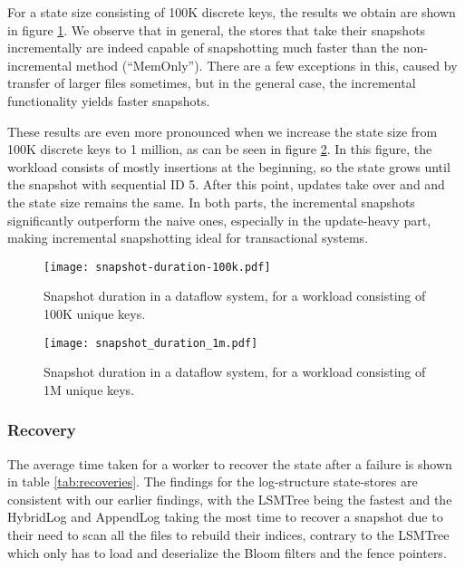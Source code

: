 For a state size consisting of 100K discrete keys, the results we obtain are shown in figure \ref{fig:snapshot-dataflow-100k}. We observe that in general, the stores that take their snapshots incrementally are indeed capable of snapshotting much faster than the non-incremental method (``MemOnly''). There are a few exceptions in this, caused by transfer of  larger files sometimes, but in the general case, the incremental functionality yields faster snapshots.

These results are even more pronounced when we increase the state size from 100K discrete keys to 1 million, as can be seen in figure \ref{fig:snapshot-dataflow-1m}. In this figure, the workload consists of mostly insertions at the beginning, so the state grows until the snapshot with sequential ID 5. After this point, updates take over and and the state size remains the same. In both parts, the incremental snapshots significantly outperform the naive ones, especially in the update-heavy part, making incremental snapshotting ideal for transactional systems.

\begin{figure}[h]
    \centering
    \texttt{[image: snapshot-duration-100k.pdf]}
    \caption{Snapshot duration in a dataflow system, for a workload consisting of 100K unique keys.}
    \label{fig:snapshot-dataflow-100k}
\end{figure}

\begin{figure}[h]
    \centering
    \texttt{[image: snapshot\_duration\_1m.pdf]}
    \caption{Snapshot duration in a dataflow system, for a workload consisting of 1M unique keys.}
    \label{fig:snapshot-dataflow-1m}
\end{figure}

\subsubsection{Recovery}

The average time taken for a worker to recover the state after a failure is shown in table \ref{tab:recoveries}. The findings for the log-structure state-stores are consistent with our earlier findings, with the LSMTree being the fastest and the HybridLog and AppendLog taking the most time to recover a snapshot due to their need to scan all the files to rebuild their indices, contrary to the LSMTree which only has to load and deserialize the Bloom filters and the fence pointers.

